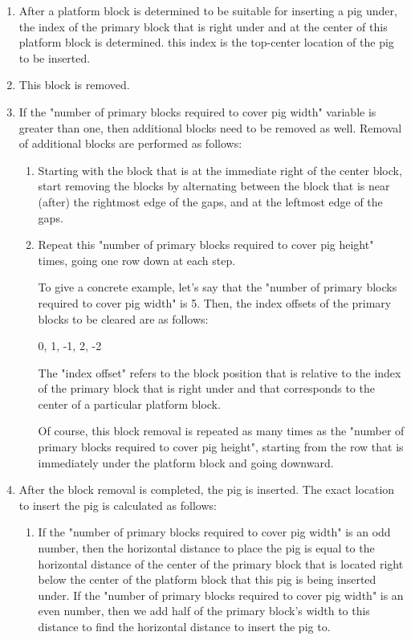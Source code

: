 \documentclass[12pt]{dalthesis}
\begin{document}
\begin{enumerate}
  \begin{enumerate}
    \item After a platform block is determined to be suitable for inserting a pig under, the index of the primary block that is right under and at the center of this platform block is determined. this index is the top-center location of the pig to be inserted.

    \item This block is removed.

    \item If the "number of primary blocks required to cover pig width" variable is greater than one, then additional blocks need to be removed as well. Removal of additional blocks are performed as follows:

    \begin{enumerate}
      \item Starting with the block that is at the immediate right of the center block, start removing the blocks by alternating between the block that is near (after) the rightmost edge of the gaps, and at the leftmost edge of the gaps.

      \item Repeat this "number of primary blocks required to cover pig height" times, going one row down at each step.

      To give a concrete example, let's say that the "number of primary blocks required to cover pig width" is 5. Then, the index offsets of the primary blocks to be cleared are as follows:

      0, 1, -1, 2, -2

      The "index offset" refers to the block position that is relative to the index of the primary block that is right under and that corresponds to the center of a particular platform block.

      Of course, this block removal is repeated as many times as the "number of primary blocks required to cover pig height", starting from the row that is immediately under the platform block and going downward.
    \end{enumerate}

    \item After the block removal is completed, the pig is inserted. The exact location to insert the pig is calculated as follows:

    \begin{enumerate}
      \item If the "number of primary blocks required to cover pig width" is an odd number, then the horizontal distance to place the pig is equal to the horizontal distance of the center of the primary block that is located right below the center of the platform block that this pig is being inserted under. If the "number of primary blocks required to cover pig width" is an even number, then we add half of the primary block's width to this distance to find the horizontal distance to insert the pig to.


\end{enumerate}
\end{enumerate}
\end{enumerate}
\end{document}
